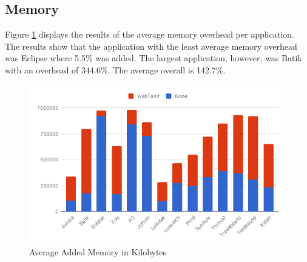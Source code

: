 \subsection{Memory}
Figure \ref{fig:Memory} displays the results of the average memory overhead per application. The results show that the application with the least average memory overhead was Eclipse where 5.5\% was added. The largest application, however, was Batik with an overhead of 344.6\%. The average overall is 142.7\%.

\begin{figure}[H]
    \centering
    \includegraphics[width=\textwidth]{images/Memory.png}
    \caption{Average Added Memory in Kilobytes}
    \label{fig:Memory}
\end{figure}